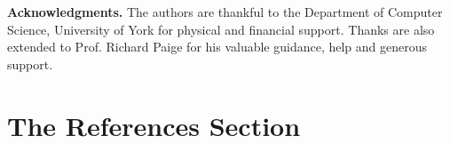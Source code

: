 \documentclass[runningheads,a4paper]{llncs}
\begin{document}
\noindent\textbf{Acknowledgments.} The authors are thankful to the Department of Computer Science, University of York for physical and financial support. %
Thanks are also extended to Prof. Richard Paige for his valuable guidance, help and generous support.




\section{The References Section}
\renewcommand\refname{}
\vspace*{-0.7cm}


\end{document}
